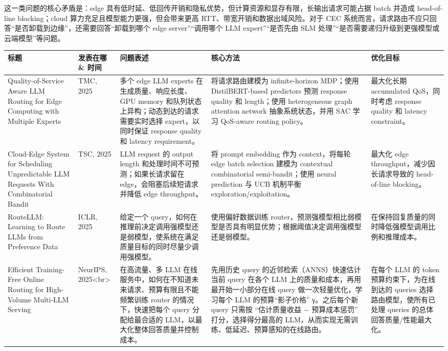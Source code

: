 \documentclass[a4paper,10pt]{ctexart}
\begin{document}
这一类问题的核心矛盾是：edge 具有低时延、低回传开销和隐私优势，但计算资源和显存有限，长输出请求可能占据 batch 并造成 head-of-line blocking；cloud 算力充足且模型能力更强，但会带来更高 RTT、带宽开销和数据出域风险。对于 CEC 系统而言，请求路由不应只回答“是否卸载到边缘”，还需要回答“卸载到哪个 edge server”“调用哪个 LLM expert”“是否先由 SLM 处理”“是否需要递归升级到更强模型或云端模型”等问题。


\begin{table}[H]
\centering
\scriptsize
\setlength{\tabcolsep}{3pt}
\renewcommand{\arraystretch}{1.15}
\begin{tabularx}{\textwidth}{|X|X|X|X|X|}
\hline
\textbf{\textbf{标题}} & \textbf{\textbf{发表在哪 \& 时间}} & \textbf{\textbf{问题表述}} & \textbf{\textbf{核心方法}} & \textbf{\textbf{优化目标}} \\ \hline
Quality-of-Service Aware LLM Routing for Edge Computing with Multiple Experts & TMC, 2025 & 多个 edge LLM experts 在生成质量、响应长度、GPU memory 和队列状态上异构；动态到达的请求需要实时选择 expert，以同时保证 response quality 和 latency requirement。 & 将请求路由建模为 infinite-horizon MDP；使用 DistilBERT-based predictors 预测 response quality 和 length；使用 heterogeneous graph attention network 抽象系统状态，并用 SAC 学习 QoS-aware routing policy。 & 最大化长期 accumulated QoS，同时考虑 response quality 和 latency constraint。 \\ \hline
Cloud-Edge System for Scheduling Unpredictable LLM Requests With Combinatorial Bandit & TSC, 2025 & LLM request 的 output length 和处理时间不可预测；如果长请求留在 edge，会阻塞后续短请求并降低 edge throughput。 & 将 prompt embedding 作为 context，将每轮 edge batch selection 建模为 contextual combinatorial semi-bandit；使用 neural prediction 与 UCB 机制平衡 exploration/exploitation。 & 最大化 edge throughput，减少因长请求导致的 head-of-line blocking。 \\ \hline
RouteLLM: Learning to Route LLMs from Preference Data & ICLR, 2025 & 给定一个 query，如何在推理前决定调用强模型还是弱模型，使系统在满足质量目标的同时尽量少调用强模型。 & 使用偏好数据训练 router，预测强模型相比弱模型是否具有明显优势；根据阈值决定调用强模型还是弱模型。 & 在保持回复质量的同时降低强模型调用比例和推理成本。 \\ \hline
Efficient Training-Free Online Routing for High-Volume Multi-LLM Serving & NeurIPS, 2025<br> & 在高流量、多 LLM 在线服务中，如何在不知道未来请求、预算有限且不能频繁训练 router 的情况下，快速把每个 query 分配给最合适的 LLM，以最大化整体回答质量并控制成本。 & 先用历史 query 的近邻检索（ANNS）快速估计当前 query 在各个 LLM 上的质量和成本，再用最开始一小部分在线 query 做一次轻量优化，学习每个 LLM 的预算“影子价格” γ。之后每个新 query 只需按 “估计质量收益 − 预算成本惩罚” 打分，选择得分最高的 LLM，从而实现无需训练、低延迟、预算感知的在线路由。 & 在每个 LLM 的 token 预算约束下，为在线到达的 queries 选择路由模型，使所有已处理 queries 的总体回答质量/性能最大化。 \\ \hline

\end{tabularx}
\end{table}
\end{document}
